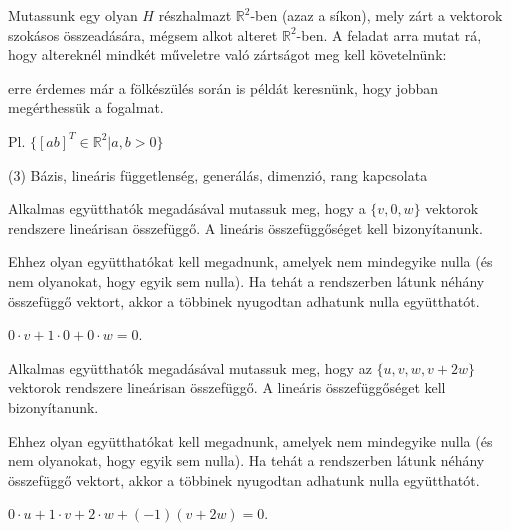 \begin{frame}
  \begin{tcolorbox}[title={2/5. {\symqueen}}]
      Mutassunk egy olyan $H$ részhalmazt $\mathbb{R}^2$-ben (azaz a síkon), mely zárt a vektorok szokásos összeadására, mégsem alkot alteret $\mathbb{R}^2$-ben.
  \tcblower
    A feladat arra mutat rá, hogy altereknél mindkét műveletre való zártságot meg kell követelnünk:\\
    \mmedskip
    
    erre érdemes már a fölkészülés során is példát keresnünk, hogy jobban megérthessük a fogalmat.\\
    \mmedskip 
    
    Pl. $\{[a b]^T \in \mathbb{R}^2|a,b > 0\}$
  \end{tcolorbox}
\end{frame}


\begin{frame}[plain]
\begin{tcolorbox}[center, colback={myyellow}, coltext={black}, colframe={myyellow}]
    {\RHuge  (3) Bázis, lineáris függetlenség, generálás, dimenzió, rang kapcsolata}
    \mmedskip
\end{tcolorbox}
\end{frame}

\begin{frame}
  \begin{tcolorbox}[title={3/1. {\symknight}}]
      Alkalmas együtthatók megadásával mutassuk meg, hogy a $\{v,0,w\}$ vektorok rendszere lineárisan összefüggő.
  \tcblower
    A lineáris összefüggőséget kell bizonyítanunk.\\
    \mmedskip

    Ehhez olyan együtthatókat kell megadnunk, amelyek nem mindegyike nulla (és nem olyanokat, hogy egyik sem nulla). Ha tehát a rendszerben látunk néhány összefüggő vektort, akkor a többinek nyugodtan adhatunk nulla együtthatót.\\
    \mmedskip 
  
    $0 \cdot v + 1 \cdot 0 + 0 \cdot w = 0$.
  \end{tcolorbox}
\end{frame}


\begin{frame}
  \begin{tcolorbox}[title={3/2. {\symknight}}]
       Alkalmas együtthatók megadásával mutassuk meg, hogy az $\{u,v,w,v+2w\}$ vektorok rendszere lineárisan összefüggő.
  \tcblower
    A lineáris összefüggőséget kell bizonyítanunk.\\
    \mmedskip

    Ehhez olyan együtthatókat kell megadnunk, amelyek nem mindegyike nulla (és nem olyanokat, hogy egyik sem nulla). Ha tehát a rendszerben látunk néhány összefüggő vektort, akkor a többinek nyugodtan adhatunk nulla együtthatót.\\
    \mmedskip 
  
    $0 \cdot u + 1 \cdot v + 2 \cdot w + (-1)(v + 2w) = 0$.
  \end{tcolorbox}
\end{frame}


